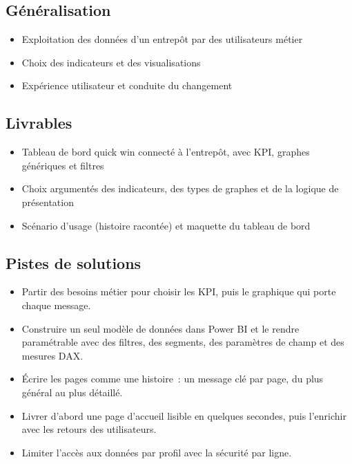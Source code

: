 \subsection*{Généralisation}
{}
\begin{itemize}
	\item Exploitation des données d'un entrepôt par des utilisateurs métier
	\item Choix des indicateurs et des visualisations
	\item Expérience utilisateur et conduite du changement
\end{itemize}

\subsection*{Livrables}
{}
\begin{itemize}
	\item Tableau de bord \og quick win\fg{} connecté à l'entrepôt, avec KPI, graphes génériques et filtres
	\item Choix argumentés des indicateurs, des types de graphes et de la logique de présentation
	\item Scénario d'usage (histoire racontée) et maquette du tableau de bord
\end{itemize}

\subsection*{Pistes de solutions}
{}
\begin{itemize}
	\item Partir des besoins métier pour choisir les KPI, puis le graphique qui porte chaque message.
	\item Construire un seul modèle de données dans Power BI et le rendre paramétrable avec des filtres, des segments, des paramètres de champ et des mesures DAX.
	\item Écrire les pages comme une histoire~: un message clé par page, du plus général au plus détaillé.
	\item Livrer d'abord une page d'accueil lisible en quelques secondes, puis l'enrichir avec les retours des utilisateurs.
	\item Limiter l'accès aux données par profil avec la sécurité par ligne.
\end{itemize}

